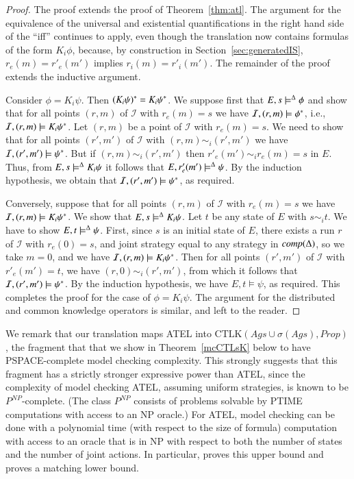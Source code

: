 \documentclass[a4wide]{article}
\newcommand{\CTLK}{\mbox{CTLK}}
\newcommand{\Prop}{Prop}
\theoremstyle{examplesty}
\newcommand{\strat}{\sigma}
\newcommand{\Ags}{\mathit{Ags}}
\newcommand{\I}{\mathcal{I}}
\newcommand{\Env}{E}
\begin{document}
\begin{proof} 
The proof extends the proof of Theorem~\ref{thm:atl}. 
The argument for the equivalence of the universal and existential quantifications in the 
right hand side 
of the ``iff'' 
continues to apply, even though the translation now contains formulas of the form $K_i\phi$, 
because, by construction in Section~\ref{sec:generatedIS}, $r_e(m) = r'_e(m')$ implies $r_i(m) = r'_i(m')$. 
The remainder of the proof extends the inductive argument. 

Consider $\phi = K_i \psi$. 
Then 
$ (K_i\psi)^* = K_i \psi^*$. 
We suppose first that $\Env, s \models^\GStrats \phi$  
and show that for all  points $(r,m)$ of  
$\I$ with $r_e(m) = s$ we have $\I, (r,m)\models \trl{\phi}$, 
i.e., $\I, (r,m)\models K_i \trl{\psi}$.  
Let $(r,m)$ be a point of  $\I$ with $r_e(m) = s$. 
We need to show that for all points $(r',m')$ of $\I$ 
with $(r,m) \sim_i (r',m')$ we have $\I, (r',m')\models \trl{\psi}$. 
But if $(r,m) \sim_i (r',m')$ then $r'_e(m') \sim_i r_e(m)=s$ in $\Env$. 
Thus, from $\Env, s \models^\GStrats K_i \psi$ it follows that 
$\Env, r'_e(m')  \models^\GStrats \psi$. By the induction hypothesis, 
we obtain that $\I, (r',m')\models \trl{\psi}$, as required. 

Conversely, suppose that  for all  points $(r,m)$ of  
$\I$ with $r_e(m) = s$ we have  $\I, (r,m)\models K_i \trl{\psi}$.  
We show that $\Env, s \models^\GStrats K_i \psi$. 
Let $t$ be any state of $\Env$ with $s\sim_i t$. We have to show $\Env, t \models^\GStrats \psi$. 
First, since $s$ is an initial state of $\Env$, there exists a run $r$ of $\I$ with $r_e(0) = s$, 
and joint strategy equal to any strategy in $\mathit{comp}(\Delta)$, so we take $m=0$, 
and we have $\I, (r,m)\models K_i \trl{\psi}$.  
Then for all points $(r',m')$ of $\I$ with 
$r'_e(m') =t$, we have $(r,0) \sim_i (r',m')$, from which it follows that $\I, (r',m')\models \trl{\psi}$.  
By the induction hypothesis, we have $\Env,t \models \psi$, as required. 
This completes the proof for the case of $\phi = K_i \psi$. The argument for the distributed and common knowledge operators 
is similar, and left to the reader. 

\end{proof} 


We remark that our translation maps ATEL into 
$\CTLK(\Ags\cup \strat(\Ags), \Prop)$, 
the fragment 
 that 
that we show in Theorem~\ref{mcCTLsK} below 
to have PSPACE-complete model checking complexity.  
This strongly suggests that this fragment  has a strictly
stronger expressive power than ATEL, since the complexity of model checking 
ATEL, 
assuming uniform strategies,  is known to be $P^{NP}$-complete. 
(The class $P^{NP}$ consists of problems solvable by PTIME computations with access to an NP oracle.) 
For ATEL, model checking can be done with  
a polynomial time (with respect to the size of formula) computation with  access to an oracle that is in NP with respect to both the number of states and the number of joint actions. 
In particular,  \cite{Schobbens2004} proves this upper bound and \cite{JD2006} proves  a matching lower bound.
\end{document}
